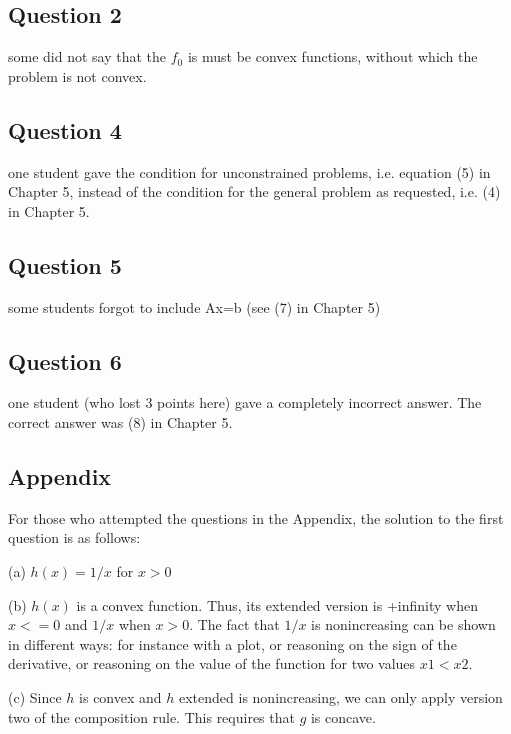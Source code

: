\subsection*{Question 2}

some did not say that the $f_0$ is must be convex functions, without which the problem is not convex.

\subsection*{Question 4}

one student gave the condition for unconstrained problems, i.e. equation (5) in Chapter 5, instead of the condition for the general problem as requested, i.e. (4) in Chapter 5.

\subsection*{Question 5}

some students forgot to include Ax=b (see (7) in Chapter 5)


\subsection*{Question 6}

one student (who lost 3 points here) gave a completely incorrect answer. The correct answer was (8) in Chapter 5.

\subsection*{Appendix}

For those who attempted the questions in the Appendix, the solution to the first question is as follows:

(a) $h(x) = 1/x$ for $x>0$

(b) $h(x)$ is a convex function. Thus, its extended version is +infinity when $x<=0$ and $1/x$ when $x>0$. The fact that $1/x$ is nonincreasing can be shown in different ways: for instance with a plot, or reasoning on the sign of the derivative, or reasoning on the value of the function for two values $x1<x2$. 

(c) Since $h$ is convex and $h$ extended is nonincreasing, we can only apply version two of the composition rule. This requires that $g$ is concave.
